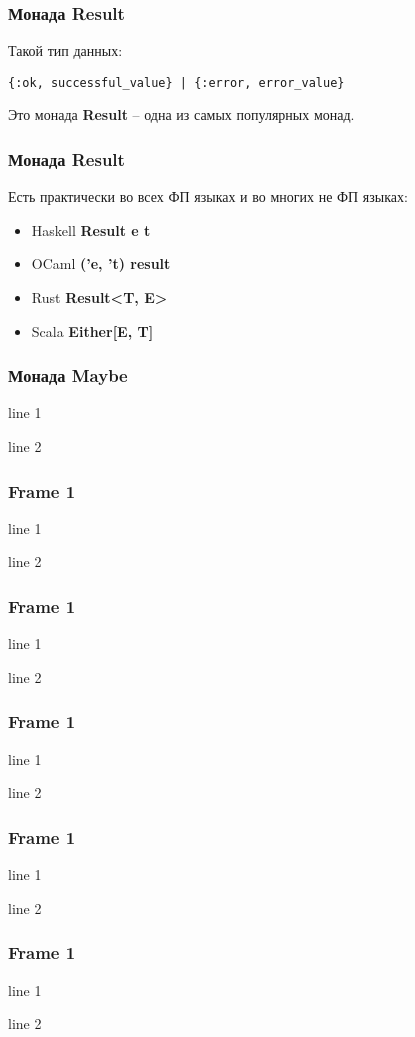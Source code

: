 \documentclass[10pt]{beamer}
\begin{document}
\begin{frame}[fragile]
  \frametitle{Монада Result}
  Такой тип данных:
  \par \bigskip
  \begin{lstlisting}
{:ok, successful_value} | {:error, error_value}
  \end{lstlisting}
  \par \bigskip
  Это монада \textbf{Result} -- одна из самых популярных монад.
\end{frame}

\begin{frame}[fragile]
  \frametitle{Монада Result}
  Есть практически во всех ФП языках и во многих не ФП языках:
  \begin{itemize}
  \item Haskell \textbf{Result e t}
  \item OCaml \textbf{('e, 't) result}
  \item Rust \textbf{Result<T, E>}
  \item Scala \textbf{Either[E, T]}
  \end{itemize}
\end{frame}

\begin{frame}
  \frametitle{Монада Maybe}
  line 1
  \par \bigskip
  line 2
\end{frame}

\begin{frame}
  \frametitle{Frame 1}
  line 1
  \par \bigskip
  line 2
\end{frame}

\begin{frame}
  \frametitle{Frame 1}
  line 1
  \par \bigskip
  line 2
\end{frame}

\begin{frame}
  \frametitle{Frame 1}
  line 1
  \par \bigskip
  line 2
\end{frame}

\begin{frame}
  \frametitle{Frame 1}
  line 1
  \par \bigskip
  line 2
\end{frame}

\begin{frame}
  \frametitle{Frame 1}
  line 1
  \par \bigskip
  line 2
\end{frame}
\end{document}
